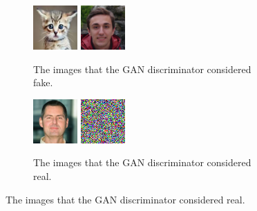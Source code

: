 \begin{figure}
	\begin{subfigure}[b]{0.5\textwidth}
		\centering
		\includegraphics[scale=1]{figures/random_images_fake_1}
		\includegraphics[scale=1]{figures/random_images_fake_2}
		\caption{The images that the GAN discriminator considered fake.}
	\end{subfigure}
	\begin{subfigure}[b]{0.5\textwidth}
		\centering
		\includegraphics[scale=1]{figures/random_images_real_1}
		\includegraphics[scale=1]{figures/random_images_real_2}
		\caption{The images that the GAN discriminator considered real.}
	\end{subfigure}
\end{figure}


